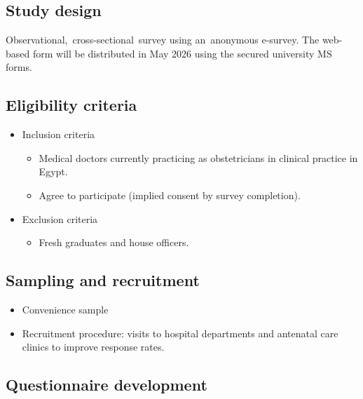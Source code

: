\documentclass[
  letterpaper,
  DIV=11,
  numbers=noendperiod]{scrartcl}
\providecommand{\tightlist}{%
  \setlength{\itemsep}{0pt}\setlength{\parskip}{0pt}}
\begin{document}
\subsection{Study design}\label{study-design}

Observational,~cross-sectional~survey using an~anonymous e-survey. The
web-based form will be distributed in May 2026 using the secured
university MS forms.

\subsection{Eligibility criteria}\label{eligibility-criteria}

\begin{itemize}
\item
  Inclusion criteria

  \begin{itemize}
  \item
    Medical doctors currently practicing as obstetricians in clinical
    practice in Egypt.
  \item
    Agree to participate (implied consent by survey completion).
  \end{itemize}
\item
  Exclusion criteria

  \begin{itemize}
  \tightlist
  \item
    Fresh graduates and house officers.
  \end{itemize}
\end{itemize}

\subsection{Sampling and recruitment}\label{sampling-and-recruitment}

\begin{itemize}
\item
  Convenience sample
\item
  Recruitment procedure: visits to hospital departments and antenatal
  care clinics to improve response rates.
\end{itemize}

\subsection{Questionnaire development}\label{questionnaire-development}
\end{document}
